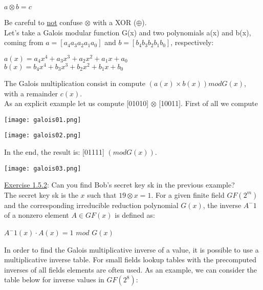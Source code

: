 \documentclass{article}
\begin{document}
\begin{center}
    $a \otimes b = c$
\end{center}

Be careful to \underline{not} confuse $\otimes$ with a XOR ($\oplus$).\\

Let's take a Galois modular function G(x) and two polynomials a(x) and b(x), coming from $a=[a_4 a_3 a_2 a_1 a_0]$ and $b=[b_4 b_3 b_2 b_1 b_0]$, respectively:

\begin{center}
    $a(x) = a_4 x^4 + a_3 x^3 + a_2 x^2 + a_1 x + a_0$ \\
    $b(x) = b_4 x^4 + b_3 x^3 + b_2 x^2 + b_1 x + b_0$
\end{center}

The Galois multiplication consist in compute $(a(x) \times b(x)) mod G(x)$, with a remainder $c(x)$.\\
As an explicit example let us compute [01010] $\otimes$ [10011]. First of all we compute 

\begin{center}
\texttt{[image: galois01.png]}
\end{center}

\begin{center}
\texttt{[image: galois02.png]}\\
\end{center}

In the end, the result is: [01111] $(mod G(x))$.

\begin{center}
\texttt{[image: galois03.png]}
\end{center}

\underline{Exercise 1.5.2}: Can you find Bob's secret key sk in the previous example?\\
The secret key sk is the $x$ such that $19 \otimes x = 1$. For a given finite field $GF(2^m)$ and the corresponding irreducible reduction polynomial $G(x)$, the inverse $A^-1$ of a nonzero element $A \in GF(x)$ is defined as:
\begin{center}
    $A^-1(x) \cdot A(x) = 1 $ $mod$ $G(x)$
\end{center}
In order to find the Galois multiplicative inverse of a value, it is possible to use a multiplicative inverse table. For small fields lookup tables with the precomputed inverses of all fields elements are often used. As an example, we can consider the table below for inverse values in $GF(2^8)$:
\end{document}
